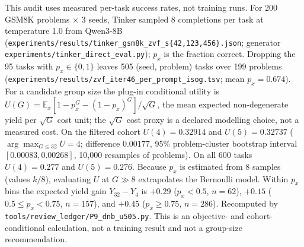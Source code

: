 This audit uses measured per-task success rates, not training runs. For 200
GSM8K problems $\times$ 3 seeds, Tinker sampled 8 completions per task at
temperature 1.0 from Qwen3-8B
(\texttt{experiments/\allowbreak{}results/\allowbreak{}tinker\_gsm8k\_zvf\_s\{42,123,456\}.json};
generator \texttt{experiments/\allowbreak{}tinker\_direct\_eval.py}); $p_x$ is the
fraction correct. Dropping the 95 tasks with $p_x\in\{0,1\}$ leaves 505
(seed, problem) tasks over 199 problems
(\texttt{experiments/\allowbreak{}results/\allowbreak{}zvf\_iter46\_per\_prompt\_isog.tsv}; mean
$p_x{=}0.674$). For a candidate group size the plug-in conditional utility is
$U(G)=\mathbb{E}_x\!\left[1-p_x^G-(1-p_x)^G\right]/\sqrt{G}$, the mean
expected non-degenerate yield per $\sqrt{G}$ cost unit; the $\sqrt{G}$ cost
proxy is a declared modelling choice, not a measured cost. On the filtered
cohort $U(4){=}0.32914$ and $U(5){=}0.32737$ ($\arg\max_{G\le32}U{=}4$;
difference $0.00177$, 95\% problem-cluster bootstrap interval
$[0.00083,0.00268]$, 10{,}000 resamples of problems). On all 600 tasks
$U(4){=}0.277$ and $U(5){=}0.276$. Because $p_x$ is estimated from 8 samples
(values $k/8$), evaluating $U$ at $G\gg8$ extrapolates the Bernoulli model.
Within $p_x$ bins the expected yield gain $Y_{32}-Y_4$ is $+0.29$
($p_x<0.5$, $n{=}62$), $+0.15$ ($0.5\le p_x<0.75$, $n{=}157$), and $+0.45$
($p_x\ge0.75$, $n{=}286$). Recomputed by
\texttt{tools/\allowbreak{}review\_ledger/\allowbreak{}P9\_dnb\_u505.py}. This is an objective- and
cohort-conditional calculation, not a training result and not a group-size
recommendation.
